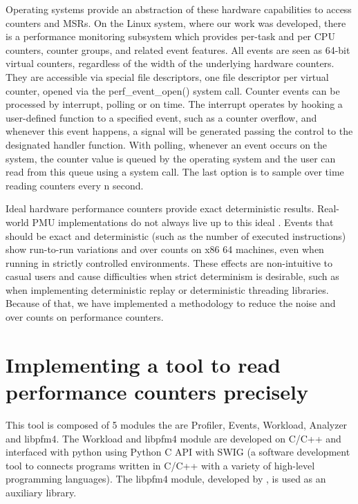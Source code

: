 Operating systems provide an abstraction of these hardware capabilities to access counters and MSRs. 
On the Linux system, where our work was developed, there is a performance monitoring subsystem which provides per-task and per CPU counters, counter groups, and related event features. 
All events are seen as 64-bit virtual counters, regardless of the width of the underlying hardware counters. 
They are accessible via special file descriptors, one file descriptor per virtual counter, opened via the perf\_event\_open() system call.  %
Counter events can be processed by interrupt, polling or on time. The interrupt operates by hooking a user-defined function to a specified event, such as a counter overflow, and whenever this event happens, a signal will be generated passing the control to the designated handler function. With polling, whenever an event occurs on the system, the counter value is queued by the operating system and the user can read from this queue using a system call. The last option is to sample over time reading counters every n second.

Ideal hardware performance counters provide exact deterministic results. Real-world PMU implementations do not always live up to this ideal \cite{Weaver2008CanTrusted, Weaver2013Non-determinismImplementations, Das2019SoK:Security, McGuire2009AnalysisKernel}. Events that should be exact and deterministic (such as the number of executed instructions) show run-to-run variations and over counts on x86 64 machines, even when running in strictly controlled environments. 
These effects are non-intuitive to casual users and cause difficulties when strict determinism is desirable, such as when implementing deterministic replay or deterministic threading libraries. 
Because of that, we have implemented a methodology to reduce the noise and over counts on performance counters.


\section{Implementing a tool to read performance counters precisely} \label{sec:implementing_a_tool_to_read_performance_counters_precisely}


This tool is composed of 5 modules the are Profiler, Events, Workload, Analyzer and libpfm4. 
The Workload and libpfm4 module are developed on C/C++ and interfaced with python using Python C API with SWIG (a software development tool to connects programs written in C/C++ with a variety of high-level programming languages). 
The libpfm4 module, developed by \cite{Eranian2008Perfmon2}, is used as an auxiliary library.

